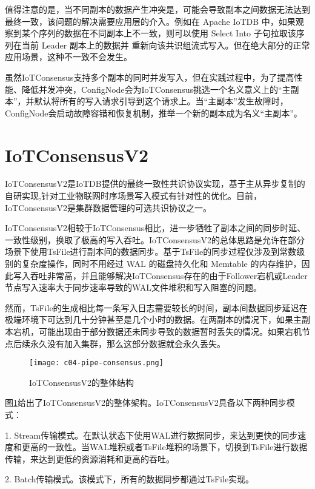 值得注意的是，当不同副本的数据产生冲突是，可能会导致副本之间数据无法达到最终一致，该问题的解决需要应用层的介入。例如在 Apache IoTDB 中，如果观察到某个序列的数据在不同副本上不一致，则可以使用 Select Into 子句拉取该序列在当前 Leader 副本上的数据并
重新向该共识组流式写入。但在绝大部分的正常应用场景，这种不一致不会发生。

虽然IoTConsensus支持多个副本的同时并发写入，但在实践过程中，为了提高性能、降低并发冲突，ConfigNode会为IoTConsensus挑选一个名义意义上的“主副本”，并默认将所有的写入请求引导到这个请求上。当“主副本”发生故障时，ConfigNode会启动故障容错和恢复机制，推举一个新的副本成为名义“主副本”。


\section{IoTConsensusV2}

IoTConsensusV2是IoTDB提供的最终一致性共识协议实现，基于主从异步复制的自研实现,针对工业物联网时序场景写入模式有针对性的优化。目前，IoTConsensusV2是集群数据管理的可选共识协议之一。

IoTConsensusV2相较于IoTConsensus相比，进一步牺牲了副本之间的同步时延、一致性级别，换取了极高的写入吞吐。IoTConsensusV2的总体思路是允许在部分场景下使用TsFile进行副本间的数据同步。基于TsFile的同步过程仅涉及到常数级别的复杂度操作，同时不用经过 WAL 的磁盘持久化和 Memtable 的内存维护，因此写入吞吐非常高，并且能够解决IoTConsensus存在的由于Follower宕机或Leader节点写入速率大于同步速率导致的WAL文件堆积和写入阻塞的问题。

然而，TsFile的生成相比每一条写入日志需要较长的时间，副本间数据同步延迟在极端环境下可达到几十分钟甚至是几个小时的数据。在两副本的情况下，如果主副本宕机，可能出现由于部分数据还未同步导致的数据暂时丢失的情况。如果宕机节点后续永久没有加入集群，那么这部分数据就会永久丢失。

\begin{figure}
    \centering
    \texttt{[image: c04-pipe-consensus.png]}
    \caption{IoTConsensusV2的整体结构}
    \label{fig:c04-pipe-consensus}
  \end{figure}
  
图\ref{fig:c04-pipe-consensus}给出了IoTConsensusV2的整体架构。IoTConsensusV2具备以下两种同步模式：

1. Stream传输模式。在默认状态下使用WAL进行数据同步，来达到更快的同步速度和更高的一致性。当WAL堆积或者TsFile堆积的场景下，切换到TsFile进行数据传输，来达到更低的资源消耗和更高的吞吐。

2. Batch传输模式。该模式下，所有的数据同步都通过TsFile实现。

